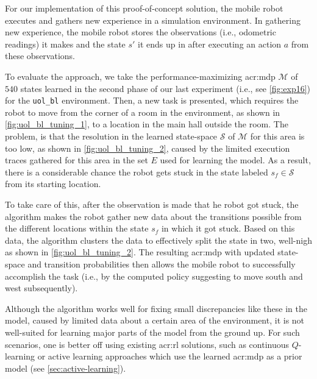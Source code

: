 For our implementation of this proof-of-concept solution, the mobile robot executes and gathers new experience in a simulation environment.
In gathering new experience, the mobile robot stores the observations (i.e., odometric readings) it makes and the state $s'$ it ends up in after executing an action $a$ from these observations.

To evaluate the approach, we take the performance-maximizing \acrshort{acr:mdp} $\mathcal{M}$ of $540$ states learned in the second phase of our last experiment (i.e., see \autoref{fig:exp16}) for the \texttt{uol\_bl} environment.
Then, a new task is presented, which requires the robot to move from the corner of a room in the environment, as shown in \autoref{fig:uol_bl_tuning_1}, to a location in the main hall outside the room.
The problem, is that the resolution in the learned state-space $\mathcal{S}$ of $\mathcal{M}$ for this area is too low, as shown in \autoref{fig:uol_bl_tuning_2}, caused by the limited execution traces gathered for this area in the set $E$ used for learning the model.
As a result, there is a considerable chance the robot gets stuck in the state labeled $s_f \in \mathcal{S}$ from its starting location.

To take care of this, after the observation is made that he robot got stuck, the algorithm makes the robot gather new data about the transitions possible from the different locations within the state $s_f$ in which it got stuck.
Based on this data, the algorithm clusters the data to effectively split the state in two, well-nigh as shown in \autoref{fig:uol_bl_tuning_2}.
The resulting \acrshort{acr:mdp} with updated state-space and transition probabilities then allows the mobile robot to successfully accomplish the task (i.e., by the computed policy suggesting to move south and west subsequently).

Although the algorithm works well for fixing small discrepancies like these in the model, caused by limited data about a certain area of the environment, it is not well-suited for learning major parts of the model from the ground up.
For such scenarios, one is better off using existing \acrshort{acr:rl} solutions, such as continuous $Q$-learning or active learning approaches which use the learned \acrshort{acr:mdp} as a prior model (see \autoref{sec:active-learning}).